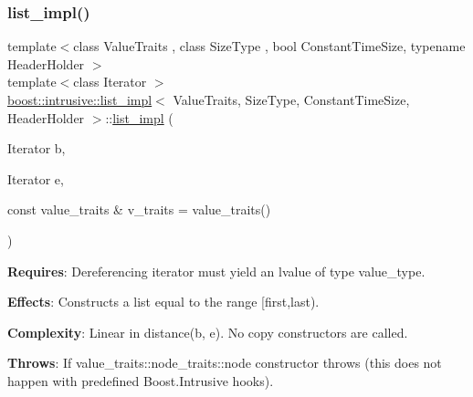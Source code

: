\subsubsection{\texorpdfstring{list\+\_\+impl()}{list\_impl()}\hspace{0.1cm}{\footnotesize\ttfamily [3/4]}}
{\footnotesize\ttfamily template$<$class Value\+Traits , class Size\+Type , bool Constant\+Time\+Size, typename Header\+Holder $>$ \\
template$<$class Iterator $>$ \\
\hyperlink{classboost_1_1intrusive_1_1list__impl}{boost\+::intrusive\+::list\+\_\+impl}$<$ Value\+Traits, Size\+Type, Constant\+Time\+Size, Header\+Holder $>$\+::\hyperlink{classboost_1_1intrusive_1_1list__impl}{list\+\_\+impl} (\begin{DoxyParamCaption}\item[{Iterator}]{b,  }\item[{Iterator}]{e,  }\item[{const value\+\_\+traits \&}]{v\+\_\+traits = {\ttfamily value\+\_\+traits()} }\end{DoxyParamCaption})\hspace{0.3cm}{\ttfamily [inline]}}

{\bfseries Requires}\+: Dereferencing iterator must yield an lvalue of type value\+\_\+type.

{\bfseries Effects}\+: Constructs a list equal to the range \mbox{[}first,last).

{\bfseries Complexity}\+: Linear in distance(b, e). No copy constructors are called.

{\bfseries Throws}\+: If value\+\_\+traits\+::node\+\_\+traits\+::node constructor throws (this does not happen with predefined Boost.\+Intrusive hooks). \mbox{\label{classboost_1_1intrusive_1_1list__impl_af87baafc7d3c1ada9da405928dd7d59a}} 
